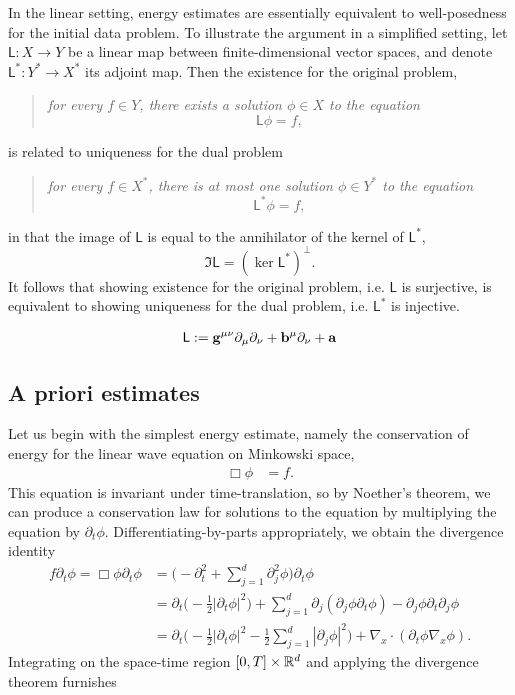 
In the linear setting, energy estimates are essentially equivalent to well-posedness for the initial data problem. To illustrate the argument in a simplified setting, let $\mathsf L : X \to Y$ be a linear map between finite-dimensional vector spaces, and denote $\mathsf L^* : Y^* \to X^*$ its adjoint map. Then the existence for the original problem, 
    \begin{quote}
        \it 
        for every $f \in Y$, there exists a solution $\phi \in X$ to the equation 
            \[
                \mathsf L \phi 
                    = f,
            \]
    \end{quote}
is related to uniqueness for the dual problem
    \begin{quote}
        \it 
        for every $f \in X^*$, there is at most one solution $\phi \in Y^*$ to the equation 
            \[
                \mathsf L^* \phi 
                    = f,
            \]
    \end{quote}
in that the image of $\mathsf L$ is equal to the annihilator of the kernel of $\mathsf L^*$,
    \[
        \Im \mathsf L = (\ker \mathsf L^*)^\perp.
    \]
It follows that showing existence for the original problem, i.e. $\mathsf L$ is surjective, is equivalent to showing uniqueness for the dual problem, i.e. $\mathsf L^*$ is injective. 


    \begin{align*}
        \mathsf L 
            := {\bf g}^{\mu\nu} \partial_\mu \partial_\nu + {\bf b}^\mu \partial_\nu + {\bf a} 
    \end{align*}

\subsection{A priori estimates}

Let us begin with the simplest energy estimate, namely the conservation of energy for the linear wave equation on Minkowski space, 
\begin{equation}\tag{W}\label{eq:linear}
    \begin{split} 
    \Box \phi 
        &= f.
    \end{split}
\end{equation}
This equation is invariant under time-translation, so by Noether's theorem, we can produce a conservation law for solutions to the equation by multiplying the equation by $\partial_t \phi$. Differentiating-by-parts appropriately, we obtain the divergence identity
    \begin{align*}
        f \partial_t \phi = \Box \phi \partial_t \phi 
            &= \Big( - \partial_t^2 + \sum_{j = 1}^d\partial_j^2 \phi \Big) \partial_t \phi \\
            &= \partial_t \Big( - \frac12 |\partial_t \phi|^2\Big) + \sum_{j = 1}^d  \partial_j (\partial_j \phi \partial_t \phi) - \partial_j \phi \partial_t \partial_j \phi \\
            &= \partial_t \Big( - \frac12 |\partial_t \phi|^2 - \frac12 \sum_{j = 1}^d |\partial_j \phi|^2 \Big) + \nabla_x \cdot (\partial_t \phi \nabla_x \phi). 
    \end{align*}
Integrating on the space-time region $[0, T] \times \mathbb R^d$ and applying the divergence theorem furnishes 

